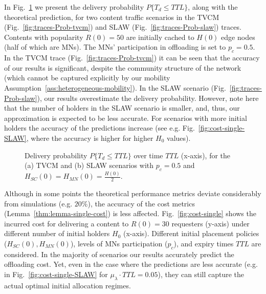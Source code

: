 \documentclass[10pt,conference,letterpaper]{IEEEtran}
\begin{document}
In Fig.~\ref{fig:traces-Prob} we present the delivery probability $P\{T_{d}\leq TTL\}$, along with the theoretical prediction, for two content traffic scenarios in the TVCM (Fig.~\ref{fig:traces-Prob-tvcm}) and SLAW (Fig.~\ref{fig:traces-Prob-slaw}) traces. Contents with popularity $R(0)=50$ are initially cached to $H(0)$ edge nodes (half of which are MNs). The MNs' participation in offloading is set to $p_{c}=0.5$. In the TVCM trace (Fig.~\ref{fig:traces-Prob-tvcm}) it can be seen that the accuracy of our results is significant, despite the community structure of the network (which cannot be captured explicitly by our mobility Assumption~\ref{ass:heterogeneous-mobility}). In the SLAW scenario (Fig.~\ref{fig:traces-Prob-slaw}), our results overestimate the delivery probability. However, note here that the number of holders in the SLAW scenario is smaller, and, thus, our approximation is expected to be less accurate. For scenarios with more initial holders the accuracy of the predictions increase (see e.g. Fig.~\ref{fig:cost-single-SLAW}, where the accuracy is higher for higher $H_{0}$ values). 

\begin{figure}
\caption{Delivery probability $P\{T_{d}\leq TTL\}$ over time $TTL$ (x-axis), for the (a) TVCM and (b) SLAW scenarios with $p_{c}=0.5$ and $H_{SC}(0)=H_{MN}(0)=\frac{H(0)}{2}$.}
\label{fig:traces-Prob}
\end{figure}



Although in some points the theoretical performance metrics deviate considerably from simulations (e.g. $20\%$), the accuracy of the cost metrics (Lemma~\ref{thm:lemma-single-cost}) is less affected. Fig.~\ref{fig:cost-single} shows the incurred cost for delivering a content to $R(0)=30$ requesters (y-axis) under different number of initial holders $H_{0}$ (x-axis). Different initial placement policies ($H_{SC}(0), H_{MN}(0)$), levels of MNs participation ($p_{c}$), and expiry times $TTL$  are considered. In the majority of scenarios our results accurately predict the offloading cost. Yet, even in the case where the predictions are less accurate (e.g. in Fig.~\ref{fig:cost-single-SLAW} for $\mu_{\lambda}\cdot TTL=0.05$), they can still capture the actual optimal initial allocation regimes.
\end{document}

